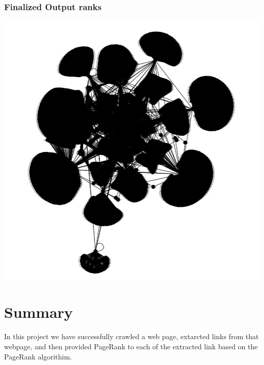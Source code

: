 \documentclass{article}
\begin{document}
\subsubsection[Finalized Output ranks]{Finalized Output ranks}
\includegraphics[scale=0.1]{image4.png}

\newpage

\section{Summary}
\label{sec:summary}
In this project we have successfully crawled a web page, extarcted links from that webpage, and then provided PageRank to each of the extracted link based on the PageRank algorithim.




\end{document}
